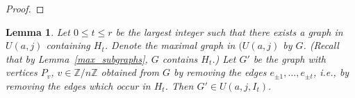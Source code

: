 \documentclass{amsproc}
\newtheorem{lemma}[theorem]{Lemma}
\theoremstyle{definition}
\theoremstyle{remark}
\numberwithin{equation}{section}
\begin{document}
\begin{proof}

\end{proof}

\begin{lemma}\label{subgraph_connected}
Let $0\leqslant t\leqslant r$ be the largest integer such that there exists a graph in $U(a,j)$ containing $H_t$.
Denote the maximal graph in $(U(a, j)$ by $G$. (Recall that by Lemma~\ref{max_subgraphs}, $G$ contains $H_t$.) 
Let $G'$ be the graph with vertices $P_v$, $v \in \mathbb Z / n \mathbb Z$ 
obtained from $G$ by removing the edges $e_{\pm 1}, \ldots, e_{\pm t}$, i.e., by removing the edges which occur in $H_t$.
Then $G'\in U(a,j,I_t)$.
\end{lemma}
\end{document}
